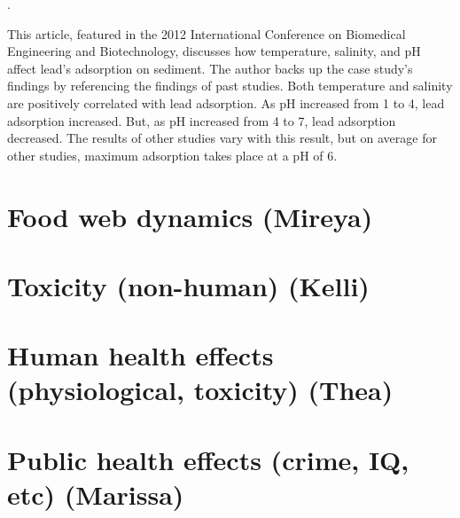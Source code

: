 \documentclass{article}\usepackage[]{graphicx}\usepackage[]{color}
\begin{document}
\medskip

\noindent {}.

\medskip

This article, featured in the 2012 International Conference on Biomedical Engineering and Biotechnology, discusses how temperature, salinity, and pH affect lead’s adsorption on sediment. The author backs up the case study’s findings by referencing the findings of past studies. Both temperature and salinity are positively correlated with lead adsorption. As pH increased from 1 to 4, lead adsorption increased. But, as pH increased from 4 to 7, lead adsorption decreased. The results of other studies vary with this result, but on average for other studies, maximum adsorption takes place at a pH of 6. 

\medskip

\section{Food web dynamics (Mireya)}

\section{Toxicity (non-human) (Kelli)}

\section{Human health effects (physiological, toxicity) (Thea)}

\section{Public health effects (crime, IQ, etc) (Marissa)}
\end{document}
